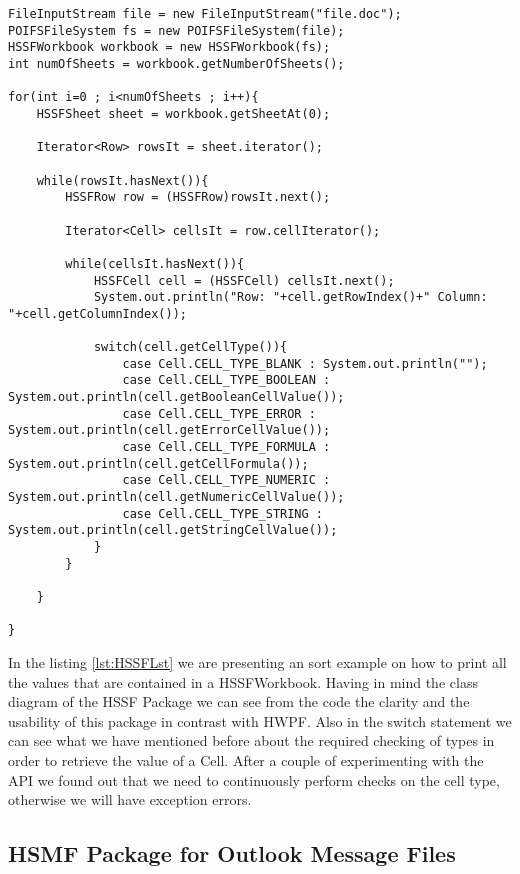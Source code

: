 \begin{lstlisting}[caption={Example on how to use Ranges and iterate through them to print all the text of a document in HWPF package},label={lst:HSSFLst}]
FileInputStream file = new FileInputStream("file.doc");
POIFSFileSystem fs = new POIFSFileSystem(file);
HSSFWorkbook workbook = new HSSFWorkbook(fs);
int numOfSheets = workbook.getNumberOfSheets();

for(int i=0 ; i<numOfSheets ; i++){
	HSSFSheet sheet = workbook.getSheetAt(0);
	
	Iterator<Row> rowsIt = sheet.iterator();
		
	while(rowsIt.hasNext()){
		HSSFRow row = (HSSFRow)rowsIt.next();
			
		Iterator<Cell> cellsIt = row.cellIterator();
			
		while(cellsIt.hasNext()){
			HSSFCell cell = (HSSFCell) cellsIt.next();
			System.out.println("Row: "+cell.getRowIndex()+" Column: "+cell.getColumnIndex());
				
			switch(cell.getCellType()){
				case Cell.CELL_TYPE_BLANK : System.out.println("");
				case Cell.CELL_TYPE_BOOLEAN : System.out.println(cell.getBooleanCellValue());
				case Cell.CELL_TYPE_ERROR : System.out.println(cell.getErrorCellValue());
				case Cell.CELL_TYPE_FORMULA : System.out.println(cell.getCellFormula());
				case Cell.CELL_TYPE_NUMERIC : System.out.println(cell.getNumericCellValue());
				case Cell.CELL_TYPE_STRING : System.out.println(cell.getStringCellValue());
			}
		}
			
	}
		
}
\end{lstlisting}

In the listing \ref{lst:HSSFLst} we are presenting an sort example on how to print all the values that are contained in a HSSFWorkbook. Having in mind the class diagram of the HSSF Package we can see from the code the clarity and the usability of this package in contrast with HWPF. Also in the switch statement we can see what we have mentioned before about the required checking of types in order to retrieve the value of a Cell. After a couple of experimenting with the API we found out that we need to continuously perform checks on the cell type, otherwise we will have exception errors.

\subsection{HSMF Package for Outlook Message Files}

